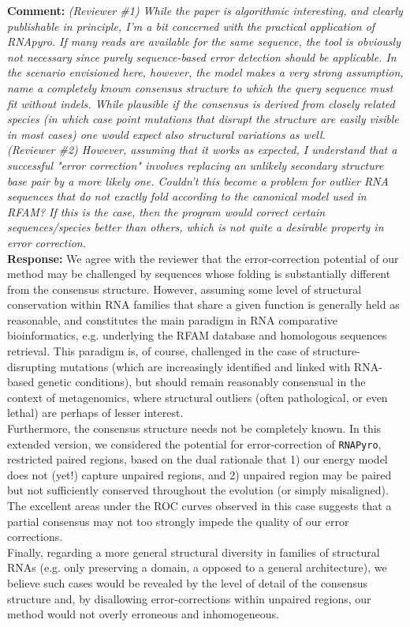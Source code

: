\documentclass[11pt,hyperref,draft]{article} %
\newcommand{\Answer}[1]{\noindent\textsf{\textbf{Response: }}{\sf#1}\\}
\newcommand{\Comment}[1]{\noindent\textsf{\textbf{Comment: }}{\it#1}\\[.5em]}
\begin{document}
\Comment{(Reviewer \#1) While the paper is algorithmic interesting, and clearly publishable in principle, I'm a bit concerned with the practical application of RNApyro. If many reads are available for the same sequence, the tool is obviously not necessary since purely sequence-based error detection should be applicable. In the scenario envisioned here, however, the model makes a very strong assumption, name a completely known consensus structure to which the query sequence must fit without indels. While plausible if the consensus is derived from closely related species (in which case point mutations that disrupt the structure are easily visible in most cases) one would expect also structural variations as well.\\
(Reviewer \#2) However, assuming that it works as expected, I understand that a successful "error correction" involves replacing an unlikely secondary structure base pair by a more likely one. Couldn't this become a problem for outlier RNA sequences that do not exactly fold according to the canonical model used in RFAM? If this is the case, then the program would correct certain sequences/species better than others, which is not quite a desirable property in error correction. 
}
\Answer{We agree with the reviewer that the error-correction potential of our method may be challenged by sequences whose folding is substantially different from the consensus structure. However, assuming some level of structural conservation within RNA families that share a given function is generally held as reasonable, and constitutes the main paradigm in RNA comparative bioinformatics, e.g. underlying the RFAM database and homologous sequences retrieval. This paradigm is, of course, challenged in the case of structure-disrupting mutations (which are increasingly identified and linked with RNA-based genetic conditions), but should remain reasonably consensual in the context of metagenomics, where structural outliers (often pathological, or even lethal) are perhaps of lesser interest. \\
Furthermore, the consensus structure needs not be completely known. In this extended version, we considered the potential for error-correction of {\tt RNAPyro}, restricted paired regions, based on the dual rationale that 1) our energy model does not (yet!) capture unpaired regions, and 2) unpaired region may be paired but not sufficiently conserved throughout the evolution (or simply misaligned). The excellent areas under the ROC curves observed in this case suggests that a partial consensus may not too strongly impede the quality of our error corrections. \\
Finally, regarding a more general structural diversity in families of structural RNAs (e.g. only preserving a domain, a opposed to a general architecture), we believe such cases would be revealed by the level of detail of the consensus structure and, by disallowing error-corrections within unpaired regions, our method would not overly erroneous and inhomogeneous. }
\end{document}

